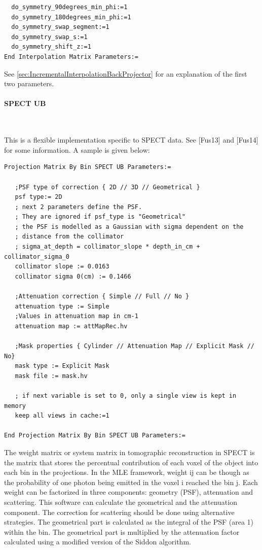 \documentclass{article}
\newcommand{\subsubsubsection}[1]{\paragraph{#1}\mbox{} \\}
\begin{document}
{{\begin{verbatim}
  do_symmetry_90degrees_min_phi:=1
  do_symmetry_180degrees_min_phi:=1
  do_symmetry_swap_segment:=1
  do_symmetry_swap_s:=1
  do_symmetry_shift_z:=1
End Interpolation Matrix Parameters:=
\end{verbatim}

See \ref{sec:IncrementalInterpolationBackProjector} for an explanation 
of the first two parameters.

{ \subsubsubsection{SPECT UB} }
\label{sec:projmatrixSPECTUB}
This is a flexible implementation specific to SPECT data. See [Fus13] and [Fus14] for some information.
A sample is given below:

\begin{verbatim}
Projection Matrix By Bin SPECT UB Parameters:=

   ;PSF type of correction { 2D // 3D // Geometrical }
   psf type:= 2D
   ; next 2 parameters define the PSF. 
   ; They are ignored if psf_type is "Geometrical"
   ; the PSF is modelled as a Gaussian with sigma dependent on the 
   ; distance from the collimator
   ; sigma_at_depth = collimator_slope * depth_in_cm + collimator_sigma_0
   collimator slope := 0.0163
   collimator sigma 0(cm) := 0.1466

   ;Attenuation correction { Simple // Full // No }
   attenuation type := Simple
   ;Values in attenuation map in cm-1
   attenuation map := attMapRec.hv

   ;Mask properties { Cylinder // Attenuation Map // Explicit Mask // No}
   mask type := Explicit Mask
   mask file := mask.hv

   ; if next variable is set to 0, only a single view is kept in memory
   keep all views in cache:=1

End Projection Matrix By Bin SPECT UB Parameters:=
\end{verbatim}

The weight matrix or system matrix in tomographic reconstruction in SPECT is the matrix that stores the
percentual contribution of each voxel of the object into each bin in the projections. In the MLE
framework, weight ij can be though as the probability of one photon being emitted in the voxel i reached
the bin j. Each weight can be factorized in three components: geometry (PSF), attenuation and scattering.
This software can calculate the geometrical and the attenuation component. The correction for scattering
should be done using alternative strategies. The geometrical part is calculated as the integral of the
PSF (area 1) within the bin. The geometrical part is multiplied by the attenuation factor calculated
using a modified version of the Siddon algorithm.  

}}
\end{document}
